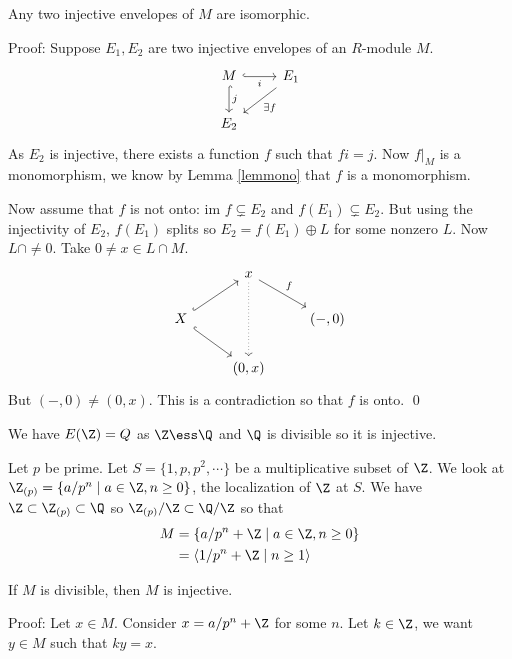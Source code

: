 \begin{thm}
Any two injective envelopes of $M$ are isomorphic. 
\end{thm}

Proof: Suppose $E_1,E_2$ are two injective envelopes of an $R$-module $M$. 
\[
\begin{tikzcd}
M \arrow[hookrightarrow,swap]{r}{i} \arrow[hookrightarrow]{d}{j} & E_1 \arrow{dl}{\exists f} \\
E_2 & 
\end{tikzcd}
\]
As $E_2$ is injective, there exists a function $f$ such that $fi=j$. Now $f|_M$ is a monomorphism, we know by Lemma \ref{lemmono} that $f$ is a monomorphism. 

Now assume that $f$ is not onto: $\text{im }f \subsetneq E_2$ and $f(E_1) \subsetneq E_2$. But using the injectivity of $E_2$, $f(E_1)$ splits so $E_2=f(E_1) \oplus L$ for some nonzero $L$. Now $L \cap  \neq 0$. Take $0 \neq x \in L \cap M$. 
\[
\begin{tikzcd}
 \; & x \arrow{dr}{f} \arrow[dotted]{dd} & \;\\
 X \arrow[hookrightarrow]{ur} \arrow[hookrightarrow]{dr} & \; & (-,0) \\
 \; & (0,x) & \;
\end{tikzcd}
\]
But $(-,0) \neq (0,x)$. This is a contradiction so that $f$ is onto. \qed \\

\begin{ex}
We have $E(\Z)=Q$ as $\Z \ess \Q$ and $\Q$ is divisible so it is injective.
\end{ex}

\begin{ex}
Let $p$ be prime. Let $S=\{1,p,p^2,\cdots\}$ be a multiplicative subset of $\Z$. We look at $\Z_{(p)}=\{a/p^n\;|\; a\in \Z,n\geq 0\}$, the localization of $\Z$ at $S$. We have $\Z \subset \Z_{(p)} \subset \Q$ so $\Z_{(p)}/\Z \subset \Q/\Z$ so that
\[
\begin{split}
M&=\{a/p^n+\Z\;|\; a \in \Z,n \geq 0\} \\
&=\langle 1/p^n+\Z\;|\; n \geq 1\rangle
\end{split}
\]
\end{ex}

\begin{prop}
If $M$ is divisible, then $M$ is injective. 
\end{prop}

Proof: Let $x \in M$. Consider $x=a/p^n+\Z$ for some $n$. Let $k \in \Z$, we want $y \in M$ such that $ky=x$. \\

